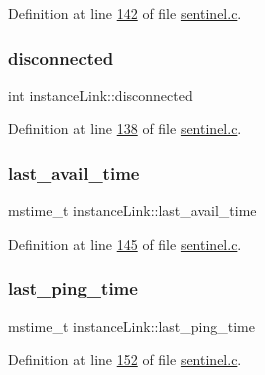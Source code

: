 Definition at line \hyperlink{sentinel_8c_source_l00142}{142} of file \hyperlink{sentinel_8c_source}{sentinel.\+c}.

\mbox{\label{structinstanceLink_a0c6fa3bcffbaa22d1fc78610bcbbaec7}} 
\subsubsection{\texorpdfstring{disconnected}{disconnected}}
{\footnotesize\ttfamily int instance\+Link\+::disconnected}



Definition at line \hyperlink{sentinel_8c_source_l00138}{138} of file \hyperlink{sentinel_8c_source}{sentinel.\+c}.

\mbox{\label{structinstanceLink_ab28f7617837924e66c82dc7f5cbde735}} 
\subsubsection{\texorpdfstring{last\+\_\+avail\+\_\+time}{last\_avail\_time}}
{\footnotesize\ttfamily mstime\+\_\+t instance\+Link\+::last\+\_\+avail\+\_\+time}



Definition at line \hyperlink{sentinel_8c_source_l00145}{145} of file \hyperlink{sentinel_8c_source}{sentinel.\+c}.

\mbox{\label{structinstanceLink_a96ee80529294b5a8d222ae7c9411e484}} 
\subsubsection{\texorpdfstring{last\+\_\+ping\+\_\+time}{last\_ping\_time}}
{\footnotesize\ttfamily mstime\+\_\+t instance\+Link\+::last\+\_\+ping\+\_\+time}



Definition at line \hyperlink{sentinel_8c_source_l00152}{152} of file \hyperlink{sentinel_8c_source}{sentinel.\+c}.

